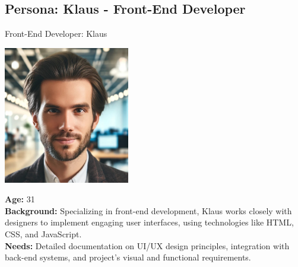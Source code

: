 \subsection*{Persona: Klaus - Front-End Developer}
\begin{persona}{Front-End Developer: Klaus}
\begin{tcbraster}[raster columns=2, raster column skip=5mm]
  \begin{tcolorbox}[width=0.2\linewidth, colback=white, colframe=white, boxrule=0pt, halign=center]
   \includegraphics[width=\linewidth, height=6cm, keepaspectratio]{Images/Klaus.jpg}
  \end{tcolorbox}
  \begin{tcolorbox}[width=0.8\linewidth, colback=white, colframe=white, boxrule=0pt]
    \textbf{Age:} 31\\
    \textbf{Background:} Specializing in front-end development, Klaus works closely with designers to implement engaging user interfaces, using technologies like HTML, CSS, and JavaScript.\\
    \textbf{Needs:} Detailed documentation on UI/UX design principles, integration with back-end systems, and project's visual and functional requirements.
  \end{tcolorbox}
\end{tcbraster}
\end{persona}

